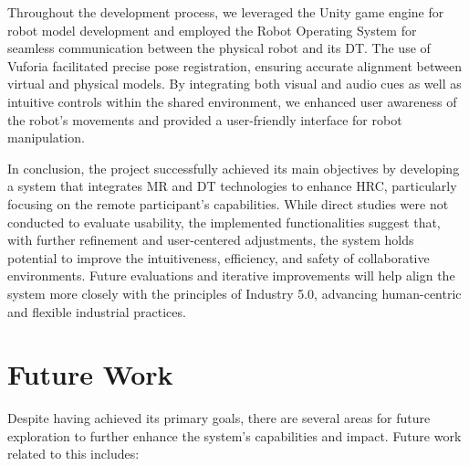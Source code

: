 Throughout the development process, we leveraged the Unity game engine for robot model development and employed the Robot Operating System for seamless communication between the physical robot and its \ac{DT}. The use of Vuforia facilitated precise pose registration, ensuring accurate alignment between virtual and physical models. By integrating both visual and audio cues as well as intuitive controls within the shared environment, we enhanced user awareness of the robot's movements and provided a user-friendly interface for robot manipulation.

In conclusion, the project successfully achieved its main objectives by developing a system that integrates \ac{MR} and \ac{DT} technologies to enhance \ac{HRC}, particularly focusing on the remote participant's capabilities. While direct studies were not conducted to evaluate usability, the implemented functionalities suggest that, with further refinement and user-centered adjustments, the system holds potential to improve the intuitiveness, efficiency, and safety of collaborative environments. Future evaluations and iterative improvements will help align the system more closely with the principles of Industry 5.0, advancing human-centric and flexible industrial practices.



\section{Future Work}

Despite having achieved its primary goals, there are several areas for future exploration to further enhance the system's capabilities and impact.
Future work related to this includes:

